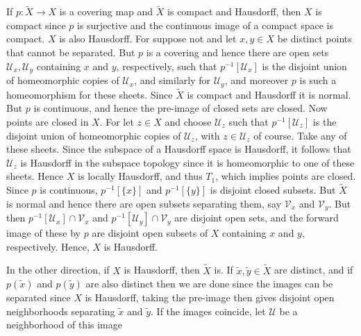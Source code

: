     \begin{solution}
        If $p:\tilde{X}\rightarrow{X}$ is a covering map and $\tilde{X}$ is
        compact and Hausdorff, then $X$ is compact since $p$ is surjective and
        the continuous image of a compact space is compact. $X$ is also
        Hausdorff. For suppose not and let $x,y\in{X}$ be distinct points that
        cannot be separated. But $p$ is a covering and hence there are open sets
        $\mathcal{U}_{x},\mathcal{U}_{y}$ containing $x$ and $y$, respectively,
        such that $p^{\minus{1}}[\mathcal{U}_{x}]$ is the disjoint union of
        homeomorphic copies of $\mathcal{U}_{x}$, and similarly for
        $\mathcal{U}_{y}$, and moreover $p$ is such a homeomorphism for these
        sheets. Since $\tilde{X}$ is compact and Hausdorff it is normal. But $p$
        is continuous, and hence the pre-image of closed sets are closed. Now
        points are closed in $X$. For let $z\in{X}$ and choose $\mathcal{U}_{z}$
        such that $p^{\minus{1}}[\mathcal{U}_{z}]$ is the disjoint union of
        homeomorphic copies of $\mathcal{U}_{z}$, with $z\in\mathcal{U}_{z}$ of
        course. Take any of these sheets. Since the subspace of a Hausdorff
        space is Hausdorff, it follows that $\mathcal{U}_{z}$ is Hausdorff in
        the subspace topology since it is homeomorphic to one of these sheets.
        Hence $X$ is locally Hausdorff, and thus $T_{1}$, which implies points
        are closed. Since $p$ is continuous, $p^{\minus{1}}[\{x\}]$ and
        $p^{\minus{1}}[\{y\}]$ is disjoint closed subsets. But $\tilde{X}$ is
        normal and hence there are open subsets separating them, say
        $\mathcal{V}_{x}$ and $\mathcal{V}_{y}$. But then
        $p^{\minus{1}}[\mathcal{U}_{x}]\cap\mathcal{V}_{x}$ and
        $p^{\minus{1}}[\mathcal{U}_{y}]\cap\mathcal{V}_{y}$ are disjoint open
        sets, and the forward image of these by $p$ are disjoint open subsets
        of $X$ containing $x$ and $y$, respectively. Hence, $X$ is Hausdorff.
        \par\hfill\par
        In the other direction, if $X$ is Hausdorff, then $\tilde{X}$ is. If
        $\tilde{x},\tilde{y}\in\tilde{X}$ are distinct, and if $p(\tilde{x})$
        and $p(\tilde{y})$ are also distinct then we are done since the images
        can be separated since $X$ is Hausdorff, taking the pre-image then gives
        disjoint open neighborhoods separating $\tilde{x}$ and $\tilde{y}$. If
        the images coincide, let $\mathcal{U}$ be a neighborhood of this image

\end{solution}
